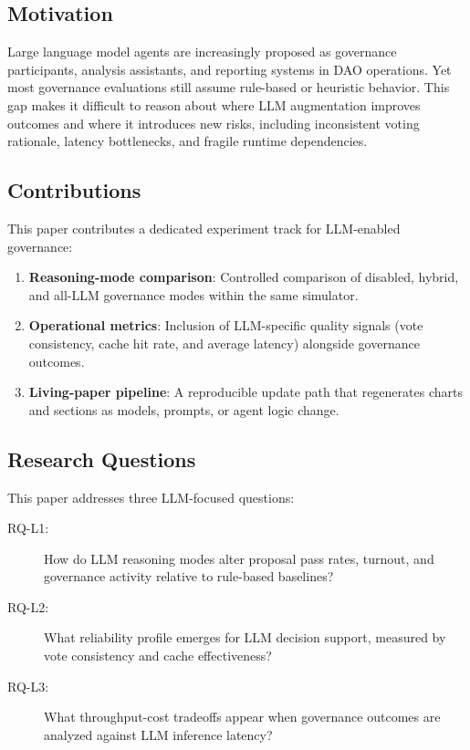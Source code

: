 
\subsection{Motivation}

Large language model agents are increasingly proposed as governance participants,
analysis assistants, and reporting systems in DAO operations. Yet most governance
evaluations still assume rule-based or heuristic behavior. This gap makes it difficult
to reason about where LLM augmentation improves outcomes and where it introduces new
risks, including inconsistent voting rationale, latency bottlenecks, and fragile
runtime dependencies.

\subsection{Contributions}

This paper contributes a dedicated experiment track for LLM-enabled governance:

\begin{enumerate}
    \item \textbf{Reasoning-mode comparison}: Controlled comparison of disabled, hybrid,
    and all-LLM governance modes within the same simulator.

    \item \textbf{Operational metrics}: Inclusion of LLM-specific quality signals
    (vote consistency, cache hit rate, and average latency) alongside governance outcomes.

    \item \textbf{Living-paper pipeline}: A reproducible update path that regenerates
    charts and sections as models, prompts, or agent logic change.
\end{enumerate}

\subsection{Research Questions}

This paper addresses three LLM-focused questions:

\begin{description}
    \item[RQ-L1:] How do LLM reasoning modes alter proposal pass rates, turnout, and governance activity relative to rule-based baselines?
    \item[RQ-L2:] What reliability profile emerges for LLM decision support, measured by vote consistency and cache effectiveness?
    \item[RQ-L3:] What throughput-cost tradeoffs appear when governance outcomes are analyzed against LLM inference latency?
\end{description}

